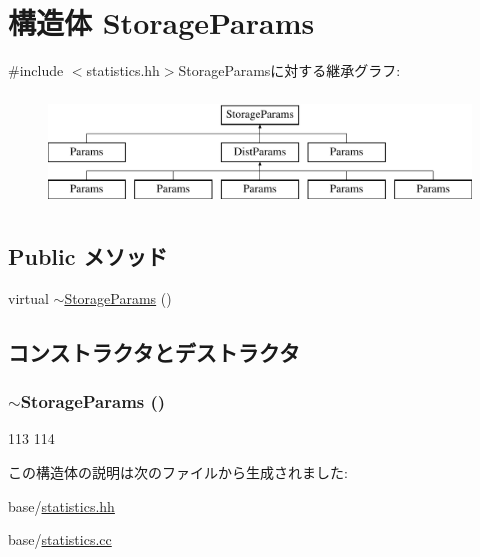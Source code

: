 \hypertarget{structStats_1_1StorageParams}{
\section{構造体 StorageParams}
\label{structStats_1_1StorageParams}
}


{\ttfamily \#include $<$statistics.hh$>$}StorageParamsに対する継承グラフ:\begin{figure}[H]
\begin{center}
\leavevmode
\includegraphics[height=3cm]{structStats_1_1StorageParams}
\end{center}
\end{figure}
\subsection*{Public メソッド}
\begin{DoxyCompactItemize}
\item 
virtual \hyperlink{structStats_1_1StorageParams_ac3316ff843e61bb01ef973cd2e41c4fe}{$\sim$StorageParams} ()
\end{DoxyCompactItemize}


\subsection{コンストラクタとデストラクタ}
\hypertarget{structStats_1_1StorageParams_ac3316ff843e61bb01ef973cd2e41c4fe}{
\subsubsection[{$\sim$StorageParams}]{\setlength{\rightskip}{0pt plus 5cm}$\sim${\bf StorageParams} ()}}
\label{structStats_1_1StorageParams_ac3316ff843e61bb01ef973cd2e41c4fe}



\begin{DoxyCode}
113 {
114 }
\end{DoxyCode}


この構造体の説明は次のファイルから生成されました:\begin{DoxyCompactItemize}
\item 
base/\hyperlink{statistics_8hh}{statistics.hh}\item 
base/\hyperlink{statistics_8cc}{statistics.cc}\end{DoxyCompactItemize}
